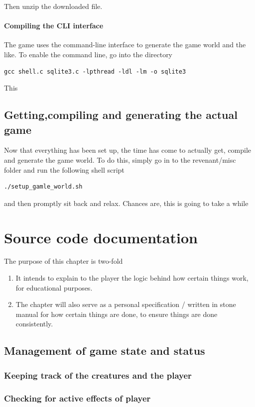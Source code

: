 \documentclass{report}
\begin{document}
Then unzip the downloaded file.
\subsubsection*{Compiling the CLI interface}
The game uses the command-line interface to generate the game world and the like. To enable the command line, go into the directory
\begin{lstlisting}
gcc shell.c sqlite3.c -lpthread -ldl -lm -o sqlite3
\end{lstlisting}
This 
\section*{Getting,compiling and generating the actual game}
Now that everything has been set up, the time has come to actually get, compile and generate the game world. To do this, simply go in to the revenant/misc folder and run the following shell script
\begin{lstlisting}
./setup_gamle_world.sh
\end{lstlisting}
and then promptly sit back and relax. Chances are, this is going to take a while
\chapter{Source code documentation}
The purpose of this chapter is two-fold
\begin{enumerate}
\item It intends to explain to the player the logic behind how certain things work, for educational purposes.
\item The chapter will also serve as a personal specification / written in stone manual for how certain things are done, to ensure things are done consistently.
\end{enumerate}
\section{Management of game state and status}
\subsection{Keeping track of the creatures and the player}

\subsection{Checking for active effects of player}
\end{document}
